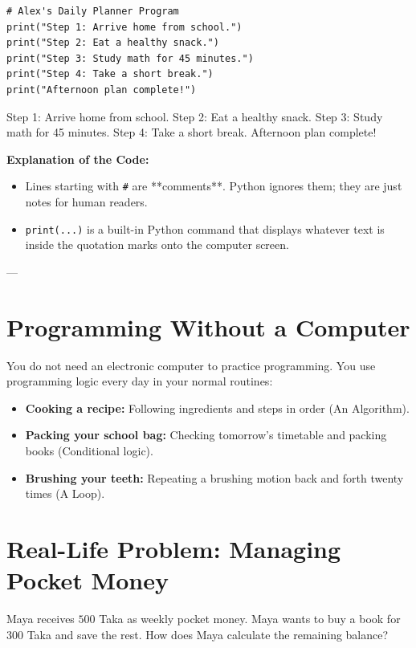 \begin{lstlisting}
# Alex's Daily Planner Program
print("Step 1: Arrive home from school.")
print("Step 2: Eat a healthy snack.")
print("Step 3: Study math for 45 minutes.")
print("Step 4: Take a short break.")
print("Afternoon plan complete!")
\end{lstlisting}

\begin{pythonoutput}
Step 1: Arrive home from school.
Step 2: Eat a healthy snack.
Step 3: Study math for 45 minutes.
Step 4: Take a short break.
Afternoon plan complete!
\end{pythonoutput}

\textbf{Explanation of the Code:}
\begin{itemize}
    \item Lines starting with \texttt{\#} are **comments**. Python ignores them; they are just notes for human readers.
    \item \texttt{print(...)} is a built-in Python command that displays whatever text is inside the quotation marks onto the computer screen.
\end{itemize}

---

\section{Programming Without a Computer}

You do not need an electronic computer to practice programming. You use programming logic every day in your normal routines:
\begin{itemize}
    \item \textbf{Cooking a recipe:} Following ingredients and steps in order (An Algorithm).
    \item \textbf{Packing your school bag:} Checking tomorrow's timetable and packing books (Conditional logic).
    \item \textbf{Brushing your teeth:} Repeating a brushing motion back and forth twenty times (A Loop).
\end{itemize}

\section{Real-Life Problem: Managing Pocket Money}

Maya receives $500$ Taka as weekly pocket money. Maya wants to buy a book for $300$ Taka and save the rest. How does Maya calculate the remaining balance?

